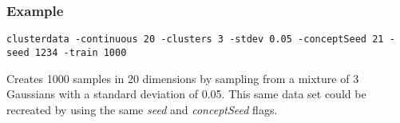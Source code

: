 \subsubsection*{Example}

{\tt }

{\tt clusterdata -continuous 20 -clusters 3 -stdev 0.05 -concept\-Seed 21 -seed 1234 -train 1000}

Creates 1000 samples in 20 dimensions by sampling from a mixture of 3 Gaussians with a standard deviation of 0.05. This same data set could be recreated by using the same {\em seed\/} and {\em concept\-Seed\/} flags.


